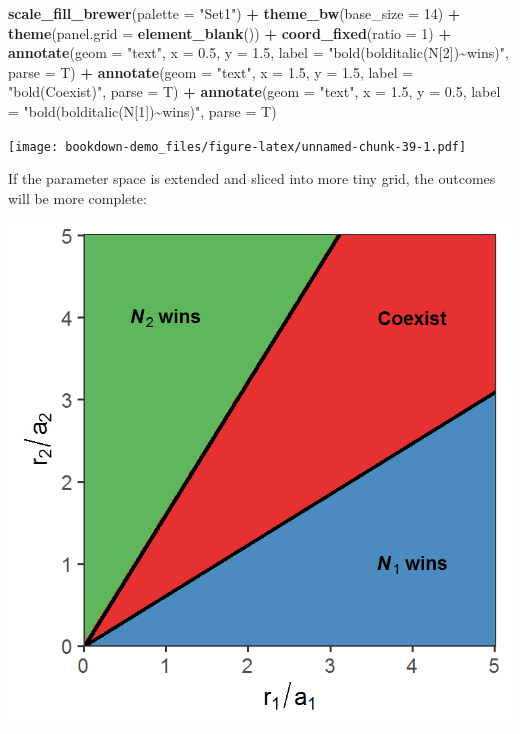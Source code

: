 \documentclass[
]{book}
\newenvironment{Shaded}{\begin{snugshade}}{\end{snugshade}}
\newcommand{\AttributeTok}[1]{\textcolor[rgb]{0.13,0.29,0.53}{#1}}
\newcommand{\DecValTok}[1]{\textcolor[rgb]{0.00,0.00,0.81}{#1}}
\newcommand{\FloatTok}[1]{\textcolor[rgb]{0.00,0.00,0.81}{#1}}
\newcommand{\FunctionTok}[1]{\textcolor[rgb]{0.13,0.29,0.53}{\textbf{#1}}}
\newcommand{\NormalTok}[1]{#1}
\newcommand{\SpecialCharTok}[1]{\textcolor[rgb]{0.81,0.36,0.00}{\textbf{#1}}}
\newcommand{\StringTok}[1]{\textcolor[rgb]{0.31,0.60,0.02}{#1}}
\begin{document}
\begin{Shaded}
\begin{Highlighting}[]
  \FunctionTok{scale\_fill\_brewer}\NormalTok{(}\AttributeTok{palette =} \StringTok{"Set1"}\NormalTok{) }\SpecialCharTok{+}
  \FunctionTok{theme\_bw}\NormalTok{(}\AttributeTok{base\_size =} \DecValTok{14}\NormalTok{) }\SpecialCharTok{+}
  \FunctionTok{theme}\NormalTok{(}\AttributeTok{panel.grid =} \FunctionTok{element\_blank}\NormalTok{()) }\SpecialCharTok{+}
  \FunctionTok{coord\_fixed}\NormalTok{(}\AttributeTok{ratio =} \DecValTok{1}\NormalTok{) }\SpecialCharTok{+}
  \FunctionTok{annotate}\NormalTok{(}\AttributeTok{geom =} \StringTok{"text"}\NormalTok{, }\AttributeTok{x =} \FloatTok{0.5}\NormalTok{, }\AttributeTok{y =} \FloatTok{1.5}\NormalTok{, }\AttributeTok{label =} \StringTok{"bold(bolditalic(N[2])\textasciitilde{}wins)"}\NormalTok{, }\AttributeTok{parse =}\NormalTok{ T) }\SpecialCharTok{+}
  \FunctionTok{annotate}\NormalTok{(}\AttributeTok{geom =} \StringTok{"text"}\NormalTok{, }\AttributeTok{x =} \FloatTok{1.5}\NormalTok{, }\AttributeTok{y =} \FloatTok{1.5}\NormalTok{, }\AttributeTok{label =} \StringTok{"bold(Coexist)"}\NormalTok{, }\AttributeTok{parse =}\NormalTok{ T) }\SpecialCharTok{+}
  \FunctionTok{annotate}\NormalTok{(}\AttributeTok{geom =} \StringTok{"text"}\NormalTok{, }\AttributeTok{x =} \FloatTok{1.5}\NormalTok{, }\AttributeTok{y =} \FloatTok{0.5}\NormalTok{, }\AttributeTok{label =} \StringTok{"bold(bolditalic(N[1])\textasciitilde{}wins)"}\NormalTok{, }\AttributeTok{parse =}\NormalTok{ T)}
\end{Highlighting}
\end{Shaded}

\texttt{[image: bookdown-demo\_files/figure-latex/unnamed-chunk-39-1.pdf]}

If the parameter space is extended and sliced into more tiny grid, the outcomes will be more complete:

\includegraphics[width=10.67in]{assignment_figures/W13}
\end{document}
